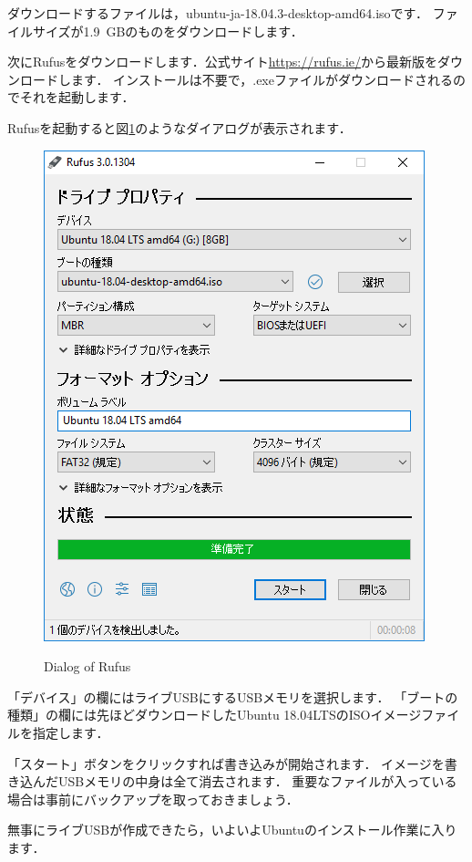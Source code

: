 \documentclass[{../../master}]{subfiles}
\begin{document}
ダウンロードするファイルは，\textsf{ubuntu-ja-18.04.3-desktop-amd64.iso}です．
ファイルサイズが\SI{1.9}{GB}のものをダウンロードします．

次に\textsf{Rufus}をダウンロードします．公式サイト\url{https://rufus.ie/}から最新版をダウンロードします．
インストールは不要で，\textsf{.exe}ファイルがダウンロードされるのでそれを起動します．

\textsf{Rufus}を起動すると図\ref{fig:rufus}のようなダイアログが表示されます．

\begin{figure}
  \centering
  \includegraphics[width=65truemm, clip]{images/rufus_jp.png}
  \label{fig:rufus}
  \caption{Dialog of Rufus}
\end{figure}

\noindent
「デバイス」の欄にはライブUSBにするUSBメモリを選択します．
「ブートの種類」の欄には先ほどダウンロードしたUbuntu 18.04LTSのISOイメージファイルを指定します．

「スタート」ボタンをクリックすれば書き込みが開始されます．
イメージを書き込んだUSBメモリの中身は全て消去されます．
重要なファイルが入っている場合は事前にバックアップを取っておきましょう．

無事にライブUSBが作成できたら，いよいよUbuntuのインストール作業に入ります．
\end{document}

